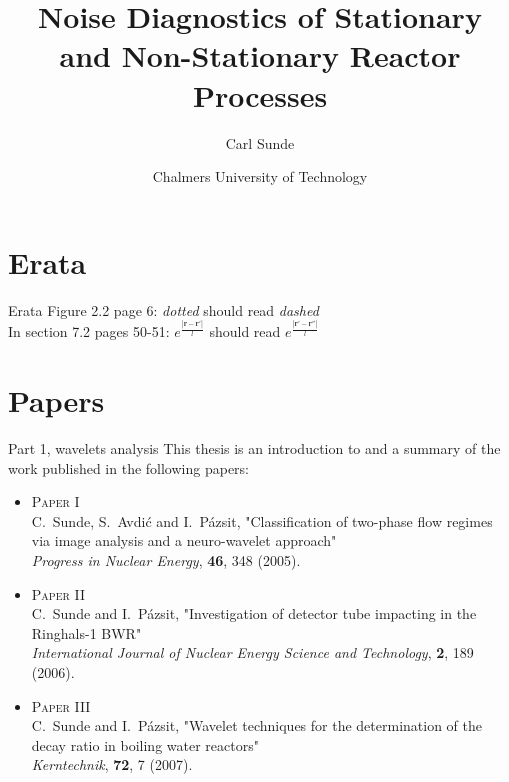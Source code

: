 \documentclass[clock,style=fyma,paper=screen,blackslide,trans=Wipe,mode=present]{powerdot}
\title{Noise Diagnostics of Stationary and Non-Stationary Reactor Processes}
\author{Carl Sunde}
\date{Chalmers University of Technology}
\begin{document}
\maketitle[{logohook=t, logopos={0.5\slidewidth,
0.47\slideheight},
logocmd={\texttt{[image: figures/framsida2.ps]}}}]
\section[slide=false]{Erata}
\begin{slide}{Erata}
Figure 2.2 page 6: \quad \textit{dotted} should read \textit{dashed }\\[5mm]
In section 7.2 pages 50-51: \quad
$e^{\frac{|\textbf{r}-\textbf{r}'|}{l}}$ should read
$e^{\frac{|\textbf{r}'-\textbf{r}''|}{l}}$
\end{slide}

\section[slide=false]{Papers}

\begin{slide}{Part 1, wavelets analysis}
This thesis is an introduction to and a summary of the work
published in the following papers:
\begin{itemize}
\item
\textsc{Paper I}\\ C.~Sunde, S.~Avdi\'{c} and I.~P\'{a}zsit, "Classification of two-phase flow regimes via image analysis and a neuro-wavelet approach"\\
\emph{Progress in Nuclear Energy}, {\bf 46}, 348 (2005).
\item
\textsc{Paper II}\\C.~Sunde and I.~P\'{a}zsit, "Investigation of detector tube impacting in the Ringhals-1 BWR"\\
\emph{International Journal of Nuclear Energy Science and
Technology}, {\bf 2}, 189 (2006).
\item
\textsc{Paper III}\\ C.~Sunde and I.~P\'{a}zsit, "Wavelet techniques for the determination of the decay ratio in boiling water reactors"\\
\emph{Kerntechnik}, \textbf{72}, 7 (2007).
\end{itemize}
\end{slide}
\end{document}
